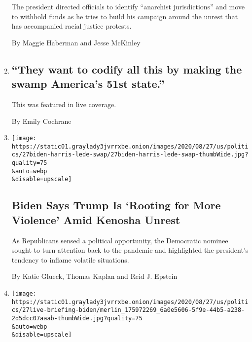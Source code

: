 \begin{enumerate}
  The president directed officials to identify ``anarchist
  jurisdictions'' and move to withhold funds as he tries to build his
  campaign around the unrest that has accompanied racial justice
  protests.

  By Maggie Haberman and Jesse McKinley
\item
  \href{/live/2020/08/27/us/rnc-fact-check/they-want-to-codify-all-this-by-making-the-swamp-americas-51st-state}{}

  \hypertarget{they-want-to-codify-all-this-by-making-the-swamp-americas-51st-state}{%
  \subsection{``They want to codify all this by making the swamp
  America's 51st
  state.''}\label{they-want-to-codify-all-this-by-making-the-swamp-americas-51st-state}}

  This was featured in live coverage.

  By Emily Cochrane
\item
  \href{/2020/08/27/us/politics/biden-kamala-harris-speech-trump.html}{}

  \texttt{[image: https://static01.graylady3jvrrxbe.onion/images/2020/08/27/us/politics/27biden-harris-lede-swap/27biden-harris-lede-swap-thumbWide.jpg?quality=75\\\&auto=webp\\\&disable=upscale]}

  \hypertarget{biden-says-trump-is-rooting-for-more-violence-amid-kenosha-unrest}{%
  \subsection{Biden Says Trump Is `Rooting for More Violence' Amid
  Kenosha
  Unrest}\label{biden-says-trump-is-rooting-for-more-violence-amid-kenosha-unrest}}

  As Republicans sensed a political opportunity, the Democratic nominee
  sought to turn attention back to the pandemic and highlighted the
  president's tendency to inflame volatile situations.

  By Katie Glueck, Thomas Kaplan and Reid J. Epstein
\item
  \href{/2020/08/27/us/elections/pelosi-says-biden-should-not-debate-trump-biden-disagrees.html}{}

  \texttt{[image: https://static01.graylady3jvrrxbe.onion/images/2020/08/27/us/politics/27live-briefing-biden/merlin\_175972269\_6a0e5606-5f9e-44b5-a238-2d5dcc07aaab-thumbWide.jpg?quality=75\\\&auto=webp\\\&disable=upscale]}


\end{enumerate}
